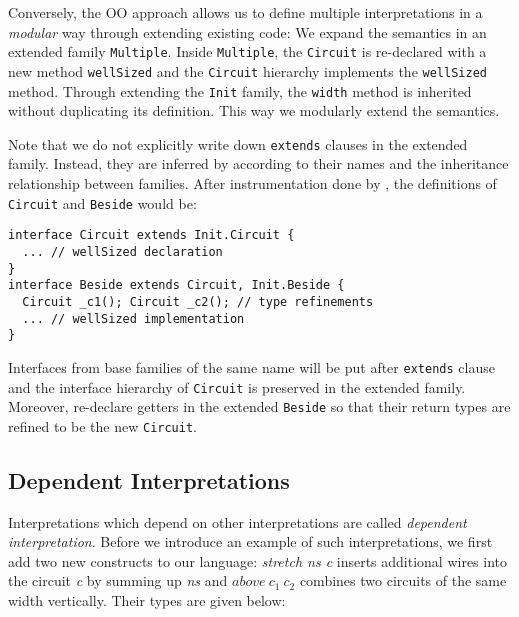 Conversely, the OO approach allows us to define multiple interpretations in a
\emph{modular} way through extending existing code:
We expand the semantics in an extended family \texttt{Multiple}.
Inside \texttt{Multiple}, the \texttt{Circuit} is re-declared
with a new method \texttt{wellSized} and the \texttt{Circuit} hierarchy
implements the \texttt{wellSized} method.
Through extending the \texttt{Init} family, the \texttt{width} method is
inherited without duplicating its definition. This way we modularly extend the
semantics.

Note that we do not explicitly write down \texttt{extends} clauses in the
extended family.
Instead, they are inferred by \name according to their
names and the inheritance relationship between families.
After instrumentation done by \name, the definitions of \texttt{Circuit} and \texttt{Beside}
would be:

\begin{lstlisting}
interface Circuit extends Init.Circuit {
  ... // wellSized declaration
}
interface Beside extends Circuit, Init.Beside {
  Circuit _c1(); Circuit _c2(); // type refinements
  ... // wellSized implementation
}
\end{lstlisting}
Interfaces from base families of the same name will be put after \texttt{extends} clause and the
interface hierarchy of \texttt{Circuit} is preserved in the extended family.
Moreover, \name re-declare getters in the extended \texttt{Beside} so that their return types are refined to be the new \texttt{Circuit}.

\subsection{Dependent Interpretations}
Interpretations which depend on other interpretations are called \emph{dependent
  interpretation}. %
Before we introduce an example of such interpretations, we first add two new
constructs to our language:
\emph{stretch ns c} inserts additional wires into the circuit \emph{c} by
summing up \emph{ns} and $above\ c_1\ c_2$ combines two circuits of the same width vertically.
Their types are given below:



